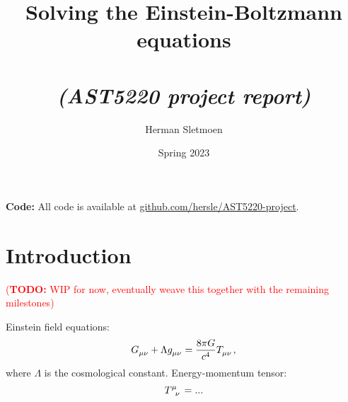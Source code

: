 \documentclass[10pt,a4paper]{article}
\newcommand\TODO[1]{\textcolor{red}{(\textbf{TODO:} #1)}}
\begin{document}
\title{\textbf{Solving the Einstein-Boltzmann equations}\\ \\\normalsize\textit{(AST5220 project report)}}
\author{Herman Sletmoen}

\date{Spring 2023}

\iffalse
\abstract
{Solve Einstein-Boltzmann equations}
{Solve Einstein-Boltzmann equations}
{Solve Einstein-Boltzmann equations}
{Solve Einstein-Boltzmann equations}
{Solve Einstein-Boltzmann equations}
\fi


\maketitle
%


\textbf{Code:} All code is available at \href{https://github.com/hersle/AST5220-project}{github.com/hersle/AST5220-project}.

\section{Introduction}

\TODO{WIP for now, eventually weave this together with the remaining milestones}

Einstein field equations:
\begin{equation}
	G\indices{_\mu_\nu} + \Lambda g\indices{_\mu_\nu} = \frac{8 \pi G}{c^4} T\indices{_\mu_\nu},
\label{eq_einstein}
\end{equation}
where $\Lambda$ is the cosmological constant.
Energy-momentum tensor:
\begin{equation}
	T\indices{^\mu_\nu} = ...
\label{eq_energy_momentum}
\end{equation}
\end{document}
